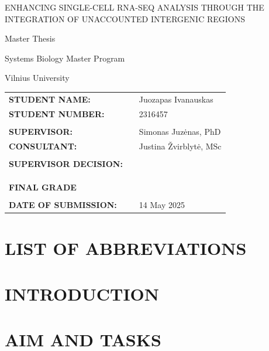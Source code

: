 \documentclass[11pt]{report}
\begin{document}
\begin{titlepage}
  \centering
  \vspace*{3cm}
  {\fontsize{16pt}{24pt}\selectfont ENHANCING SINGLE-CELL RNA-SEQ ANALYSIS THROUGH THE INTEGRATION OF UNACCOUNTED INTERGENIC REGIONS\par}
  {\fontsize{12pt}{24pt}\selectfont Master Thesis\par}
  {\fontsize{12pt}{24pt}\selectfont Systems Biology Master Program\par}
  {\fontsize{12pt}{24pt}\selectfont Vilnius University\par}
  \vspace*{5cm}
  \begin{tabular}{@{}lll@{}}
    \textbf{STUDENT NAME:} & \hspace{3cm} & Juozapas Ivanauskas \\
    \textbf{STUDENT NUMBER:} & & 2316457 \\
    \\
    \textbf{SUPERVISOR:} & & Simonas Juzėnas, PhD \\
    \textbf{CONSULTANT:} & & Justina Žvirblytė, MSc \\
    \\
    \textbf{SUPERVISOR DECISION:} & & \dotfill \\
    \\
    \\
    \\
    \textbf{FINAL GRADE} & & \dotfill \\
    \\
    \textbf{DATE OF SUBMISSION:} & & 14 May 2025 \\
  \end{tabular}

\end{titlepage}

\tableofcontents

\chapter{LIST OF ABBREVIATIONS}


\chapter{INTRODUCTION}


\chapter{AIM AND TASKS}

\end{document}
